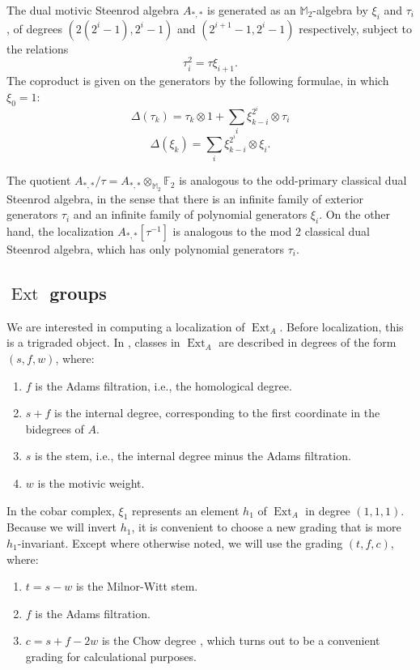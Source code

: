 \documentclass[10pt]{amsart}
\begin{document}
\begin{thm}\cite{V2} \cite[Theorem 12.6]{V3} 
The dual motivic Steenrod algebra $A_{*,*}$ is generated as an ${\ensuremath{\mathbb{M}}}_2$-algebra by 
$\xi_i$ and $\tau_i$,
of degrees $(2(2^i-1),2^i-1)$ and $(2^{i+1}-1,2^i-1)$ respectively,
subject to the
relations
\[ \tau_i^2 = \tau \xi_{i+1}.\]
The coproduct is given on the generators by the following formulae, in which $\xi_0 = 1$:
\[ \Delta(\tau_k) = \tau_k\otimes 1 + \sum_i \xi_{k-i}^{2^i}\otimes \tau_i\]
\[ \Delta(\xi_k) = \sum_i  \xi_{k-i}^{2^i} \otimes \xi_i.\]
\end{thm}

\begin{rmk}
The quotient $A_{*,*}/\tau=A_{*,*}\otimes_{{\ensuremath{\mathbb{M}}}_2}{\ensuremath{\mathbb{F}}}_2$ is analogous to the 
odd-primary classical dual Steenrod algebra, in the sense that there is an
infinite family of exterior generators $\tau_i$ and an infinite family
of polynomial generators $\xi_i$.  On the other hand,
the localization $A_{*,*}[\tau^{-1}]$ is analogous to the
mod 2 classical dual Steenrod algebra, which has only polynomial generators
$\tau_i$.
\end{rmk}

\subsection{$\operatorname{Ext}$ groups}

We are interested in computing a localization of
$\operatorname{Ext}_A$.
Before localization, this is a trigraded object.  In \cite{Istems}, classes in $\operatorname{Ext}_A$ are described in degrees of the
form $(s,f,w)$, where:
\begin{enumerate}
\item
$f$ is the Adams filtration, i.e., the homological degree.
\item
$s+f$ is the internal degree, corresponding to the
first coordinate in the bidegrees of $A$.
\item
$s$ is the stem, i.e., the internal degree minus
the Adams filtration.
\item
$w$ is the motivic weight.
\end{enumerate}

In the cobar complex,
$\xi_1$ represents an element $h_1$ of $\operatorname{Ext}_A$
in degree $(1,1,1)$.  Because we will invert $h_1$,
it is convenient to choose a new grading that is more $h_1$-invariant.
Except where otherwise noted, we will use the grading
$(t, f, c)$, where:
\begin{enumerate}
\item
$t = s - w$ is the Milnor-Witt stem.
\item
$f$ is the Adams filtration.
\item
$c = s +f - 2w$ is the Chow degree \cite{Istems}, which turns out to be a 
convenient grading for calculational purposes.
\end{enumerate}
\end{document}

